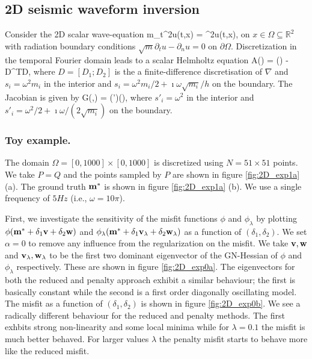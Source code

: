 \documentclass{iopart}
\begin{document}
\subsection{2D seismic waveform inversion}
Consider the 2D scalar wave-equation
\bq
m\partial_t^2u(t,x) = \nabla^2u(t,x),
\eq
on $x \in \Omega \subseteq \mathbb{R}^2$  with radiation boundary conditions $\sqrt{m}\partial_tu - \partial_n u = 0$ on $\partial\Omega$.
Discretization in the temporal Fourier domain leads to a scalar Helmholtz equation
\bq
A() = () - D^TD,
\eq
where $D = [D_1; D_2]$ is the a finite-difference discretisation of $\nabla$ and $s_i = \omega^2 m_i$ in the interior 
and $s_i = \omega^2 m_i/2 + \imath\omega\sqrt{m_i}/h$ on the boundary.
The Jacobian is given by
\bq
G(,) = (')(),
\eq
where $s'_i = \omega^2$ in the interior and $s'_i = \omega^2/2 + \imath\omega/(2\sqrt{m_i})$ on the boundary.

\subsubsection{Toy example.}
The domain $\Omega = [0,1000]\times [0,1000]$ is discretized using $N=51\times 51$ points. We take $P=Q$ and the points sampled by 
$P$ are shown in figure \ref{fig:2D_exp1a} (a). The ground truth $\mathbf{m}^*$ is shown in figure  \ref{fig:2D_exp1a} (b). We use a single frequency
of $5 Hz$ (i.e., $\omega = 10\pi$).

First, we investigate the sensitivity of the misfit functions $\phi$ and $\phi_{\lambda}$ by plotting $\phi(\mathbf{m}^* + \delta_1 \mathbf{v} + \delta_2\mathbf{w})$ and
$\phi_{\lambda}(\mathbf{m}^* + \delta_1 \mathbf{v}_{\lambda} + \delta_2\mathbf{w}_{\lambda})$ as a function of $(\delta_1,\delta_2)$. We set $\alpha = 0$ to 
remove any influence from the regularization on the misfit.
We take $\mathbf{v}, \mathbf{w}$ and $\mathbf{v}_{\lambda}, \mathbf{w}_{\lambda}$ to be the first two dominant eigenvector of the GN-Hessian of 
$\phi$ and $\phi_{\lambda}$ respectively. These are shown in figure \ref{fig:2D_exp0a}. The eigenvectors for both the reduced and penalty
approach exhibit a similar behaviour; the first is basically constant while the second is a first order diagonally oscillating model.
The misfit as a function of $(\delta_1,\delta_2)$ is shown in figure \ref{fig:2D_exp0b}. We see a radically different behaviour for the reduced and penalty methods.
The first exhbits strong non-linearity and some local minima while for $\lambda=0.1$ the misfit is much better behaved. For larger values $\lambda$ the penalty misfit
starts to behave more like the reduced misfit.
\end{document}
